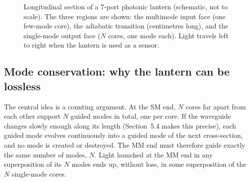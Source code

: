 \documentclass[11pt,a4paper]{article}
\begin{document}
\begin{figure}[t]
\centering
{}
\caption{Longitudinal section of a 7-port photonic lantern (schematic, not to scale). The three regions are shown: the multimode input face (one few-mode core), the adiabatic transition (centimetres long), and the single-mode output face ($N$ cores, one mode each). Light travels left to right when the lantern is used as a sensor.}
\label{fig:lantern}
\end{figure}

\subsection{Mode conservation: why the lantern can be lossless}
The central idea is a counting argument. At the SM end, $N$ cores far apart from each other support $N$ guided modes in total, one per core. If the waveguide changes slowly enough along its length (Section~5.4 makes this precise), each guided mode evolves continuously into a guided mode of the next cross-section, and no mode is created or destroyed. The MM end must therefore guide exactly the same number of modes, $N$. Light launched at the MM end in any superposition of its $N$ modes ends up, without loss, in some superposition of the $N$ single-mode cores.
\end{document}
